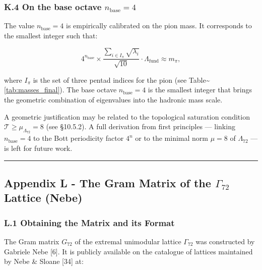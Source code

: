 \documentclass[11pt]{article}
\let\oldmathcal\mathcal
\renewcommand{\mathcal}[1]{\oldmathcal{#1}}
\begin{document}
\hypertarget{k.4-on-the-base-octave-n_textbase-4}{%
\subsubsection{\texorpdfstring{K.4 On the base octave
\(n_{\text{base}} = 4\)}{K.4 On the base octave n\_\{\textbackslash text\{base\}\} = 4}}\label{k.4-on-the-base-octave-n_textbase-4}}

The value \(n_{\text{base}} = 4\) is empirically calibrated on the pion
mass. It corresponds to the smallest integer such that:

\[
4^{n_{\text{base}}} \times \frac{\sum_{i \in I_\pi} \sqrt{\lambda_i}}{\sqrt{10}} \cdot \Lambda_{\text{fund}} \approx m_\pi,
\]

where \(I_\pi\) is the set of three pentad indices for the pion (see
Table\textasciitilde{}\ref{tab:masses_final}). The base octave
\(n_{\text{base}} = 4\) is the smallest integer that brings the
geometric combination of eigenvalues into the hadronic mass scale.

A geometric justification may be related to the topological saturation
condition \(\mathcal{T} \geq \mu_{\Lambda_{72}} = 8\) (see §10.5.2). A
full derivation from first principles --- linking
\(n_{\text{base}} = 4\) to the Bott periodicity factor \(4^n\) or to the
minimal norm \(\mu = 8\) of \(\Lambda_{72}\) --- is left for future
work.

\begin{center}\rule{0.5\linewidth}{0.5pt}\end{center}

\hypertarget{appendix-l---the-gram-matrix-of-the-gamma_72-lattice-nebe}{%
\subsection{\texorpdfstring{Appendix L - The Gram Matrix of the
\(\Gamma_{72}\) Lattice
(Nebe)}{Appendix L - The Gram Matrix of the \textbackslash Gamma\_\{72\} Lattice (Nebe)}}\label{appendix-l---the-gram-matrix-of-the-gamma_72-lattice-nebe}}

\hypertarget{l.1-obtaining-the-matrix-and-its-format}{%
\subsubsection{L.1 Obtaining the Matrix and its
Format}\label{l.1-obtaining-the-matrix-and-its-format}}

The Gram matrix \(G_{72}\) of the extremal unimodular lattice
\(\Gamma_{72}\) was constructed by Gabriele Nebe {[}6{]}. It is publicly
available on the catalogue of lattices maintained by Nebe \& Sloane
{[}34{]} at:
\end{document}
